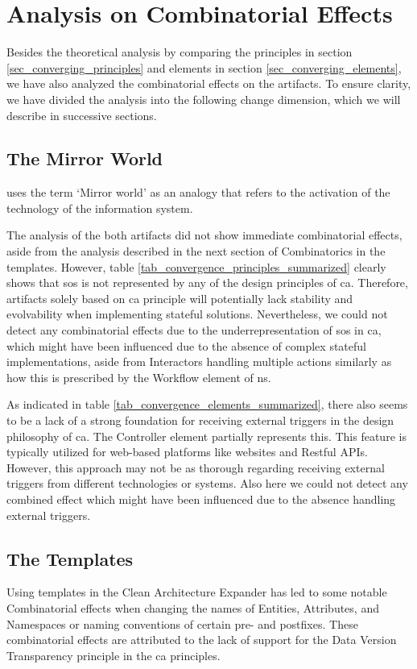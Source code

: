 \section{Analysis on Combinatorial Effects} \label{combinatorics}

Besides the theoretical analysis by comparing the principles in section
\ref{sec_converging_principles} and elements in section \ref{sec_converging_elements}, we
have also analyzed the combinatorial effects on the artifacts. To ensure clarity, we have
divided the analysis into the following change dimension, which we will describe in
successive sections.

\subsection{The Mirror World}
\textcite[137]{mannaert_normalized_2016} uses the term \enquote*{Mirror world} as an
analogy that refers to the activation of the technology of the information system. 

The analysis of the both artifacts did not show immediate combinatorial effects, aside
from the analysis described in the next section of Combinatorics in the templates.
However, table \ref{tab_convergence_principles_summarized} clearly shows that \gls{sos} is
not represented by any of the design principles of \gls{ca}. Therefore, artifacts solely
based on \gls{ca} principle will potentially lack stability and evolvability when
implementing stateful solutions. Nevertheless, we could not detect any combinatorial
effects due to the underrepresentation of \acrlong{sos} in \gls{ca}, which might have been
influenced due to the absence of complex stateful implementations, aside from Interactors
handling multiple actions similarly as how this is prescribed by the Workflow element of
\gls{ns}.

As indicated in table \ref{tab_convergence_elements_summarized}, there also seems to be a
lack of a strong foundation for receiving external triggers in the design philosophy of
\gls{ca}. The Controller element partially represents this. This feature is typically
utilized for web-based platforms like websites and Restful APIs. However, this approach
may not be as thorough regarding receiving external triggers from different technologies
or systems. Also here we could not detect any combined effect which might have been
influenced due to the absence handling external triggers.

\subsection{The Templates}
Using templates in the Clean Architecture Expander has led to some notable Combinatorial
effects when changing the names of Entities, Attributes, and Namespaces or naming
conventions of certain pre- and postfixes. These combinatorial effects are attributed to
the lack of support for the Data Version Transparency principle in the \gls{ca}
principles.

